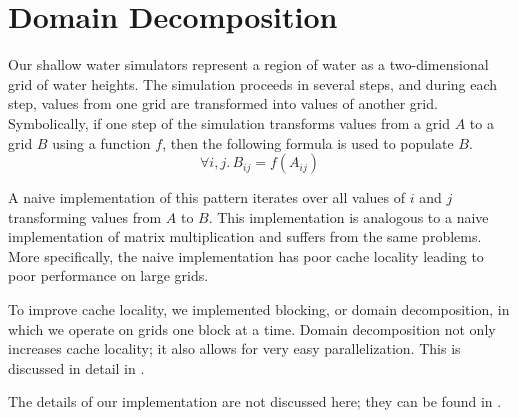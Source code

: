 \section{Domain Decomposition}\label{sec:domaindecomp}
Our shallow water simulators represent a region of water as a two-dimensional
grid of water heights. The simulation proceeds in several steps, and during
each step, values from one grid are transformed into values of another grid.
Symbolically, if one step of the simulation transforms values from a grid $A$
to a grid $B$ using a function $f$, then the following formula is used to
populate $B$.
\[
  \forall i, j.\, B_{ij} = f(A_{ij})
\]

A naive implementation of this pattern iterates over all values of $i$ and $j$
transforming values from $A$ to $B$. This implementation is analogous to a
naive implementation of matrix multiplication and suffers from the same
problems. More specifically, the naive implementation has poor cache locality
leading to poor performance on large grids.

To improve cache locality, we implemented blocking, or domain decomposition, in
which we operate on grids one block at a time. Domain decomposition not only
increases cache locality; it also allows for very easy parallelization. This is
discussed in detail in .

The details of our implementation are not discussed here; they can be found in
.
